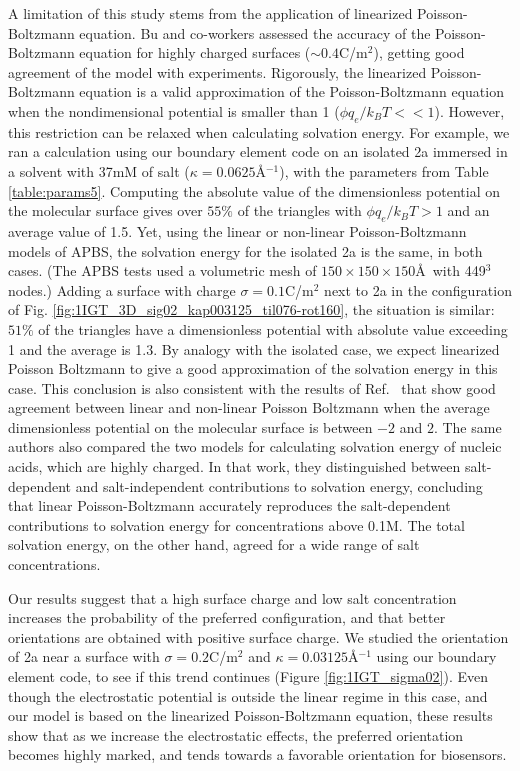  \medskip
A limitation of this study stems from the application of linearized Poisson-Boltzmann equation.
Bu and co-workers\cite{BuVakninTravesset2006} assessed the accuracy of the Poisson-Boltzmann equation for highly charged surfaces ($\sim 0.4$C/m$^2$), getting good agreement of the model with experiments. 
Rigorously, the linearized Poisson-Boltzmann equation is a valid approximation of the Poisson-Boltzmann equation when the nondimensional potential is smaller than 1 ($\phi q_e/k_BT<<1$).
However, this restriction can be relaxed when calculating solvation energy. 
For example, we ran a calculation using our boundary element code on an isolated \ig 2a immersed in a solvent with 37mM of salt ($\kappa = 0.0625$\AA$^{-1}$), with the parameters from Table \ref{table:params5}. 
Computing the absolute value of the dimensionless potential on the molecular surface gives over $55\%$ of the triangles with $\phi q_e/k_BT>1$ and an average value of 1.5.
Yet, using the linear or non-linear Poisson-Boltzmann models of APBS,\cite{BakerETal2001} the solvation energy for the isolated \ig 2a is the same, in both cases.
(The APBS tests used a volumetric mesh of $150\times 150\times 150$\AA\ with 449$^3$ nodes.)
Adding a surface with charge $\sigma=0.1$C/m$^2$ next to \ig 2a in the configuration of Fig. \ref{fig:1IGT_3D_sig02_kap003125_til076-rot160}, the situation is similar: $51\%$ of the triangles have a dimensionless potential with absolute value exceeding 1 and the average is 1.3. By analogy with the isolated  case, we expect linearized Poisson Boltzmann to give a good approximation of the solvation energy in this case.
This conclusion is also consistent with the results of Ref.~ that show good agreement between linear and non-linear Poisson Boltzmann when the average dimensionless potential on the molecular surface is between $-2$ and $2$. 
The same authors also compared the two models for calculating solvation energy of nucleic acids, which are highly charged.\cite{FogolariETal2015} In that work, they distinguished between salt-dependent and salt-independent contributions to solvation energy, concluding that linear Poisson-Boltzmann accurately reproduces the salt-dependent contributions to solvation energy for concentrations above 0.1M.
The total solvation energy, on the other hand, agreed for a wide range of salt concentrations. 


Our results suggest that a high surface charge and low salt concentration increases the probability of the preferred configuration, and that better orientations are obtained with positive surface charge.
We studied the orientation of \ig 2a near a surface with $\sigma =0.2$C/m${^2}$ and $\kappa=0.03125$\AA$^{-1}$ using our boundary element code, to see if this trend continues (Figure \ref{fig:1IGT_sigma02}). 
Even though the electrostatic potential is outside the linear regime in this case, and our model is based on the linearized Poisson-Boltzmann equation, these results show that as we increase the electrostatic effects, the preferred orientation becomes highly marked, and tends towards a favorable orientation for biosensors.

